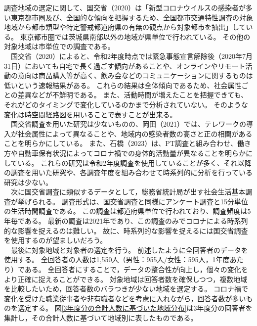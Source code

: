 \documentclass[paper={210mm,297mm},line_length=35zw,number_of_lines=31,head_space=30mm,gutter=40mm,baselineskip=2.0zw,headfoot_verticalposition=1.5zw]{jlreq} %
\begin{document}
調査地域の選定に関して、国交省（2020）は「新型コロナウイルスの感染者が多い東京都市圏及び、全国的な傾向を把握するため、全国都市交通特性調査の対象地域から都市類型や特定警戒都道府県の有無の観点から対象都市を抽出」している。
東京都市圏では茨城県南部以外の地域が県単位で行われている。
その他の対象地域は市単位での調査である。\\
　国交省（2020）によると、令和2年度時点では緊急事態宣言解除後（2020年7月31日）においても自宅で長く過ごす傾向があることや、オンラインやリモート活動の意向は商品購入等が高く、飲み会などのコミュニケーションに関するものは低いという速報結果がある。
これらの結果は全体傾向であるため、社会属性ごとの差異などが不鮮明である。
また、活動時間が増えたことを把握できても、それがどのタイミングで変化しているのかまで分析されていない。
そのような変化は時空間経路図を用いることで表すことが出来る。\\
　国交省調査を用いた研究は少ないものの、岡田（2021）では、テレワークの導入が社会属性によって異なることや、地域内の感染者数の高さと正の相関があることを明らかにしている。
また、石橋（2023）は、PT調査と組み合わせ、働き方や自動車保有状況によってコロナ禍での身体的活動量が異なることを明らかにしている。
これらの研究は令和2年度調査を使用していることが多く、それ以降の調査を用いた研究や、各調査年度を組み合わせて時系列的に分析を行っている研究は少ない。\\
　次に国交省調査に類似するデータとして，総務省統計局が出す社会生活基本調査が挙げられる。
調査形式は、国交省調査と同様にアンケート調査と15分単位の生活時間調査である。
この調査は都道府県単位で行われており、調査頻度は5年毎である。
最新の調査は2021年であり、この調査のみでコロナによる時系列的な影響を捉えるのは難しい。
故に、時系列的な影響を捉えるには国交省調査を使用するのが望ましいだろう。\\
　最後に対象地域と対象者の選定を行う。
前述したように全回答者のデータを使用する。
全回答者の人数は1,550人（男性：955人/女性：595人，1年度あたり）である。
全回答者にすることで，データの整合性が向上し，個々の変化をより正確に捉えることができる。
対象地域は回答者数を確保しつつ，複数地域を比較したいため，回答者数のバラつきが少ない地域を選定する。
コロナ禍で変化を受けた職業従事者や非有職者などを考慮に入れながら，回答者数が多いものを選定する。
図\ref{3年度分の合計人数に基づいた地域分布}は3年度分の回答者を集計し，その合計人数に基づいて地域別に表したものである。\\
\end{document}
